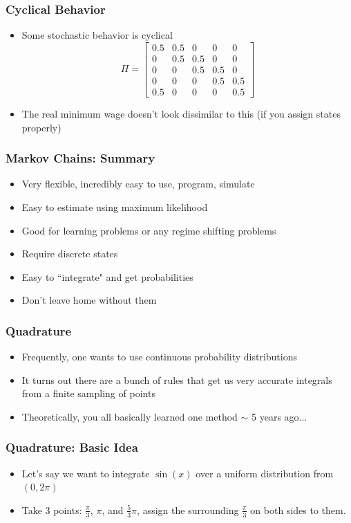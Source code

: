 \documentclass{beamer}
\begin{document}
\begin{frame}
\frametitle[alignment=center]{Cyclical Behavior}
\begin{itemize}
\item Some stochastic behavior is cyclical
$$\Pi=\left[\begin{array}{ccccc}0.5 & 0.5 & 0 & 0 & 0\\ 0 & 0.5 & 0.5 & 0 & 0 \\ 0 & 0 & 0.5 & 0.5 & 0 \\ 0 & 0 & 0 & 0.5 & 0.5 \\ 0.5 & 0 & 0 & 0 & 0.5\end{array}\right]$$
\item The real minimum wage doesn't look dissimilar to this (if you assign states properly)
\end{itemize}
\end{frame}


\begin{frame}
\frametitle[alignment=center]{Markov Chains: Summary}
\begin{itemize}
\item Very flexible, incredibly easy to use, program, simulate
\bigskip
\item Easy to estimate using maximum likelihood
\bigskip
\item Good for learning problems or any regime shifting problems
\bigskip
\item Require discrete states
\bigskip
\item Easy to ``integrate" and get probabilities
\bigskip
\item Don't leave home without them
\end{itemize}
\end{frame}

\begin{frame}
\frametitle[alignment=center]{Quadrature}
\begin{itemize}
\item Frequently, one wants to use continuous probability distributions 
\bigskip
\item It turns out there are a bunch of rules that get us very accurate integrals from a finite sampling of points
\bigskip
\item Theoretically, you all basically learned one method $\sim$ 5 years ago...
\end{itemize}
\end{frame}

\begin{frame}
\frametitle[alignment=center]{Quadrature: Basic Idea}
\begin{itemize}
\item Let's say we want to integrate $\sin(x)$ over a uniform distribution from $(0,2\pi)$
\bigskip
\item Take 3 points: $\frac{\pi}{3}$, $\pi$, and $\frac{5}{3}\pi$, assign the surrounding $\frac{\pi}{3}$ on both sides to them.
\end{itemize}
\end{frame}
\end{document}
